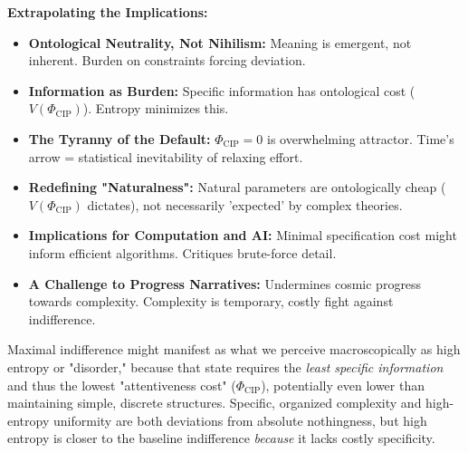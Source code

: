 \documentclass[11pt, a4paper]{article}
\newcommand{\subt}[1]{\mathrm{#1}}
\begin{document}
\textbf{Extrapolating the Implications:}
\begin{itemize}
    \item \textbf{Ontological Neutrality, Not Nihilism:} Meaning is emergent, not inherent. Burden on constraints forcing deviation.
    \item \textbf{Information as Burden:} Specific information has ontological cost ($V(\Phi_{\subt{CIP}})$). Entropy minimizes this.
    \item \textbf{The Tyranny of the Default:} $\Phi_{\subt{CIP}} = 0$ is overwhelming attractor. Time's arrow = statistical inevitability of relaxing effort.
    \item \textbf{Redefining "Naturalness":} Natural parameters are ontologically cheap ($V(\Phi_{\subt{CIP}})$ dictates), not necessarily 'expected' by complex theories.
    \item \textbf{Implications for Computation and AI:} Minimal specification cost might inform efficient algorithms. Critiques brute-force detail.
    \item \textbf{A Challenge to Progress Narratives:} Undermines cosmic progress towards complexity. Complexity is temporary, costly fight against indifference.
\end{itemize}

Maximal indifference might manifest as what we perceive macroscopically as high entropy or "disorder," because that state requires the \textit{least specific information} and thus the lowest "attentiveness cost" ($\Phi_{\subt{CIP}}$), potentially even lower than maintaining simple, discrete structures. Specific, organized complexity and high-entropy uniformity are both deviations from absolute nothingness, but high entropy is closer to the baseline indifference \textit{because} it lacks costly specificity.
\end{document}
